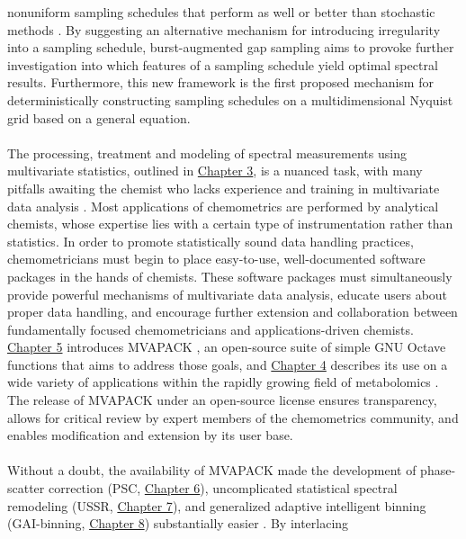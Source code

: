 \begin{doublespace}
nonuniform sampling schedules that perform as well or better than stochastic
methods \cite{worley:jmr2015}. By suggesting an alternative mechanism for
introducing irregularity into a sampling schedule, burst-augmented gap
sampling aims to provoke further investigation into which features of a
sampling schedule yield optimal spectral results. Furthermore, this new
framework is the first proposed mechanism for deterministically constructing
sampling schedules on a multidimensional Nyquist grid \cite{eddy:jmr2012}
based on a general equation.
\\\\
The processing, treatment and modeling of spectral measurements using
multivariate statistics, outlined in \hyperlink{chapter.3}{Chapter 3},
is a nuanced task, with many pitfalls awaiting the chemist who lacks
experience and training in multivariate data analysis
\cite{worley:cmb2013,worley:aca2015}. Most applications of chemometrics
are performed by analytical chemists, whose expertise lies with a certain
type of instrumentation rather than statistics. In order to promote
statistically sound data handling practices, chemometricians
must begin to place easy-to-use, well-documented software packages in the
hands of chemists. These software packages must simultaneously provide
powerful mechanisms of multivariate data analysis, educate users about
proper data handling, and encourage further extension and collaboration
between fundamentally focused chemometricians and applications-driven
chemists. \hyperlink{chapter.5}{Chapter 5} introduces MVAPACK
\cite{worley:acscb2014}, an open-source suite of simple GNU Octave
\cite{eaton2008} functions that aims to address those goals, and
\hyperlink{chapter.4}{Chapter 4} describes its use on a wide variety of
applications within the rapidly growing field of metabolomics
\cite{worley:acscb2014,marshall:metab2015,worley:aca2015}. The release
of MVAPACK under an open-source license ensures transparency, allows for
critical review by expert members of the chemometrics community, and
enables modification and extension by its user base.
\\\\
Without a doubt, the availability of MVAPACK made the development of
phase-scatter correction
(PSC, \hyperlink{chapter.6}{Chapter 6}),
uncomplicated statistical spectral remodeling
(USSR, \hyperlink{chapter.7}{Chapter 7}),
and generalized adaptive intelligent binning
(GAI-binning, \hyperlink{chapter.8}{Chapter 8})
substantially easier
\cite{worley:cils2014,worley:jbnmr2015,worley:cils2015a}. By interlacing

\end{doublespace}
